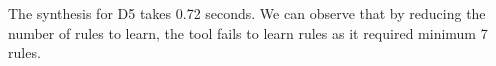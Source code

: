 The synthesis for D5 takes 0.72 seconds. We can observe that by reducing the number of rules to learn, the tool fails to learn rules as it required minimum 7 rules.









